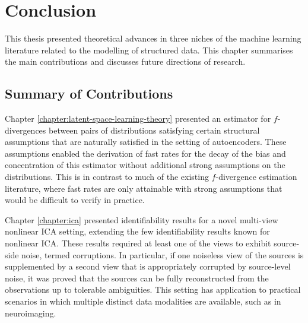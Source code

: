 \chapter{Conclusion}\label{chapter:conclusion}

\ifpdf
    \graphicspath{{Chapter7/Figs/Raster/}{Chapter7/Figs/PDF/}{Chapter7/Figs/}}
\else
    \graphicspath{{Chapter7/Figs/Vector/}{Chapter7/Figs/}}
\fi

This thesis presented theoretical advances in three niches of the machine learning literature related to the modelling of structured data.
This chapter summarises the main contributions and discusses future directions of research.

\section{Summary of Contributions}

Chapter \ref{chapter:latent-space-learning-theory} presented an estimator for $f$-divergences between pairs of distributions satisfying certain structural assumptions that are naturally satisfied in the setting of autoencoders. 
These assumptions enabled the derivation of fast rates for the decay of the bias and concentration of this estimator without additional strong assumptions on the distributions.
This is in contrast to much of the existing $f$-divergence estimation literature, where fast rates are only attainable with strong assumptions that would be difficult to verify in practice.


Chapter \ref{chapter:ica} presented identifiability results for a novel multi-view nonlinear ICA setting, extending the few identifiability results known for nonlinear ICA.
These results required at least one of the views to exhibit source-side noise, termed corruptions.
In particular, if one noiseless view of the sources is supplemented by a second view that is appropriately corrupted by source-level noise, it was proved that the sources can be fully reconstructed from the observations up to tolerable ambiguities.
This setting has application to practical scenarios in which multiple distinct data modalities are available, such as in neuroimaging. %


